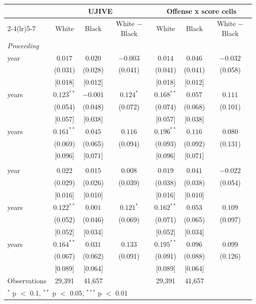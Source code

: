 \begin{tabular}{lcccccc}
\toprule
 & \multicolumn{3}{c}{UJIVE} & \multicolumn{3}{c}{Offense x score cells} \\
\cmidrule(lr){2-4}\cmidrule(lr){5-7}
 & White & Black & White $-$ Black & White & Black & White $-$ Black \\
\midrule
\multicolumn{7}{l}{\textit{Proceeding}} \\
\quad 1 year & $0.017$ & $0.020$ & $-0.003$ & $0.014$ & $0.046$ & $-0.032$ \\
 & (0.031) & (0.028) & (0.041) & (0.041) & (0.041) & (0.058) \\
 & [0.018] & [0.012] &  & [0.018] & [0.012] &  \\
\quad 2 years & $0.123^{**}$ & $-0.001$ & $0.124^{*}$ & $0.168^{**}$ & $0.057$ & $0.111$ \\
 & (0.054) & (0.048) & (0.072) & (0.074) & (0.068) & (0.101) \\
 & [0.057] & [0.038] &  & [0.057] & [0.038] &  \\
\quad 3 years & $0.161^{**}$ & $0.045$ & $0.116$ & $0.196^{**}$ & $0.116$ & $0.080$ \\
 & (0.069) & (0.065) & (0.094) & (0.093) & (0.092) & (0.131) \\
 & [0.096] & [0.071] &  & [0.096] & [0.071] &  \\
\addlinespace
\multicolumn{7}{l}{\textit{Revoked}} \\
\quad 1 year & $0.022$ & $0.015$ & $0.008$ & $0.019$ & $0.041$ & $-0.022$ \\
 & (0.029) & (0.026) & (0.039) & (0.038) & (0.038) & (0.054) \\
 & [0.016] & [0.010] &  & [0.016] & [0.010] &  \\
\quad 2 years & $0.122^{**}$ & $0.001$ & $0.121^{*}$ & $0.162^{**}$ & $0.053$ & $0.109$ \\
 & (0.052) & (0.046) & (0.069) & (0.071) & (0.065) & (0.097) \\
 & [0.052] & [0.034] &  & [0.052] & [0.034] &  \\
\quad 3 years & $0.164^{**}$ & $0.031$ & $0.133$ & $0.195^{**}$ & $0.096$ & $0.099$ \\
 & (0.067) & (0.062) & (0.091) & (0.091) & (0.088) & (0.126) \\
 & [0.089] & [0.064] &  & [0.089] & [0.064] &  \\
\midrule
Observations & 29,391 & 41,657 &  & 29,391 & 41,657 &  \\
\bottomrule
\multicolumn{7}{l}{\footnotesize $^{*}$ p $<$ 0.1, $^{**}$ p $<$ 0.05, $^{***}$ p $<$ 0.01} \\
\end{tabular}
